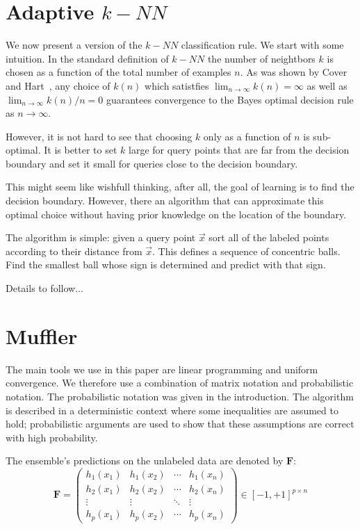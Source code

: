 \documentclass{colt2015} %
\newcommand{\vF}{\mathbf{F}}
\newcommand{\x}{\vec{x}}
\begin{document}
\section{Adaptive $k-NN$}

We now present a version of the $k-NN$ classification rule. We start
with some intuition. In the standard definition of $k-NN$ the number
of neightbors $k$ is chosen as a function of the total number of
examples $n$. As was shown by Cover and Hart~\cite{}, any choice of
$k(n)$ which satistfies $\lim_{n \to \infty}k(n)=\infty$ as well as
$\lim_{n \to \infty}k(n)/n =0$ guarantees convergence to the Bayes
optimal decision rule as $n \to \infty$.

However, it is not hard to see that choosing $k$ only as a function of
$n$ is sub-optimal. It is better to set $k$ large for query points
that are far from the decision boundary and set it small for queries
close to the decision boundary.

This might seem like wishfull thinking, after all, the goal of
learning is to find the decision boundary. However, there an algorithm
that can approximate this optimal choice without having prior
knowledge on the location of the boundary.

The algorithm is simple: given a query point $\x$ sort all of the labeled
points according to their distance from $\x$. This defines a sequence
of concentric balls. Find the smallest ball whose sign is determined
and predict with that sign.

Details to follow...

\section{Muffler}
\label{sec:setup}

The main tools we use in this paper are linear programming and uniform
convergence. We therefore use a combination of matrix notation and
probabilistic notation. The probabilistic notation was given in
the introduction. The algorithm is described in a deterministic
context where some inequalities are assumed to hold; probabilistic
arguments are used to show that these assumptions are correct with high
probability.

The ensemble's predictions on the unlabeled data are denoted by $\vF$:
\begin{equation}
\vF = 
 \begin{pmatrix}
   h_1(x_1) & h_1(x_2) & \cdots & h_1 (x_n) \\
   h_2(x_1) &  h_2(x_2) & \cdots & h_2 (x_n) \\
   \vdots   & \vdots    & \ddots &  \vdots  \\
   h_p(x_1)  &  h_p (x_2)  & \cdots &  h_p (x_n)
 \end{pmatrix}
 \in [-1, +1]^{p \times n}
\end{equation}
\end{document}
